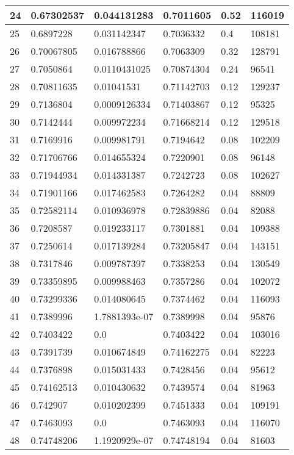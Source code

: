 \begin{longtable}{|l|l|l|l|l|l|}
24 & 0.67302537 & 0.044131283 & 0.7011605 & 0.52 & 116019 \\ \hline 
25 & 0.6897228 & 0.031142347 & 0.7036332 & 0.4 & 108181 \\ \hline 
26 & 0.70067805 & 0.016788866 & 0.7063309 & 0.32 & 128791 \\ \hline 
27 & 0.7050864 & 0.0110431025 & 0.70874304 & 0.24 & 96541 \\ \hline 
28 & 0.70811635 & 0.01041531 & 0.71142703 & 0.12 & 129237 \\ \hline 
29 & 0.7136804 & 0.0009126334 & 0.71403867 & 0.12 & 95325 \\ \hline 
30 & 0.7142444 & 0.009972234 & 0.71668214 & 0.12 & 129518 \\ \hline 
31 & 0.7169916 & 0.009981791 & 0.7194642 & 0.08 & 102209 \\ \hline 
32 & 0.71706766 & 0.014655324 & 0.7220901 & 0.08 & 96148 \\ \hline 
33 & 0.71944934 & 0.014331387 & 0.7242723 & 0.08 & 102627 \\ \hline 
34 & 0.71901166 & 0.017462583 & 0.7264282 & 0.04 & 88809 \\ \hline 
35 & 0.72582114 & 0.010936978 & 0.72839886 & 0.04 & 82088 \\ \hline 
36 & 0.7208587 & 0.019233117 & 0.7301881 & 0.04 & 109388 \\ \hline 
37 & 0.7250614 & 0.017139284 & 0.73205847 & 0.04 & 143151 \\ \hline 
38 & 0.7317846 & 0.009787397 & 0.7338253 & 0.04 & 130549 \\ \hline 
39 & 0.73359895 & 0.009988463 & 0.7357286 & 0.04 & 102072 \\ \hline 
40 & 0.73299336 & 0.014080645 & 0.7374462 & 0.04 & 116093 \\ \hline 
41 & 0.7389996 & 1.7881393e-07 & 0.7389998 & 0.04 & 95876 \\ \hline 
42 & 0.7403422 & 0.0 & 0.7403422 & 0.04 & 103016 \\ \hline 
43 & 0.7391739 & 0.010674849 & 0.74162275 & 0.04 & 82223 \\ \hline 
44 & 0.7376898 & 0.015031433 & 0.7428456 & 0.04 & 95612 \\ \hline 
45 & 0.74162513 & 0.010430632 & 0.7439574 & 0.04 & 81963 \\ \hline 
46 & 0.742907 & 0.010202399 & 0.7451333 & 0.04 & 109191 \\ \hline 
47 & 0.7463093 & 0.0 & 0.7463093 & 0.04 & 116070 \\ \hline 
48 & 0.74748206 & 1.1920929e-07 & 0.74748194 & 0.04 & 81603 \\ \hline 

\end{longtable}
